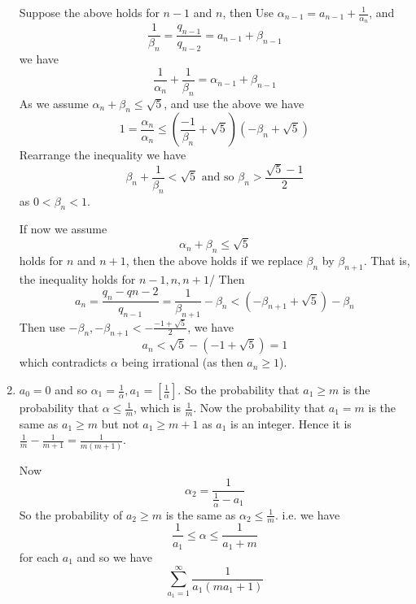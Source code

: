 \begin{enumerate}
      Suppose the above holds for $n-1$ and $n$, then
      Use $\alpha_{n-1}=a_{n-1}+\frac{1}{\alpha_n}$, and
      $$\frac{1}{\beta_n}=\frac{q_{n-1}}{q_{n-2}}=a_{n-1}+\beta_{n-1}$$
      we have
      $$\frac{1}{\alpha_n}+\frac{1}{\beta_n}=\alpha_{n-1}+\beta_{n-1}$$
      As we assume $\alpha_n+\beta_n \le \sqrt{5}$, and use the above we have
      $$1=\frac{\alpha_n}{\alpha_n} \le \left(\frac{-1}{\beta_n} +\sqrt{5}\right)
      \left(-\beta_n+\sqrt{5}\right)$$
      Rearrange the inequality we have
      $$\beta_n+\frac{1}{\beta_n} < \sqrt{5} \text{ and so } \beta_n >\frac{\sqrt{5}-1}{2}$$
      as $0<\beta_n<1$.

      If now we assume $$\alpha_n+\beta_n \le \sqrt{5}$$ holds for $n$ and $n+1$, then the above
      holds if we replace $\beta_n$ by $\beta_{n+1}$. That is, the inequality holds for $n-1,n,n+1$/
      Then
      $$a_n=\frac{q_n-q{n-2}}{q_{n-1}}=\frac{1}{\beta_{n+1}}-\beta_n
      <(-\beta_{n+1}+\sqrt{5})-\beta_n$$
      Then use $-\beta_n,-\beta_{n+1}<-\frac{-1+\sqrt{5}}{2}$, we have
      $$a_n<\sqrt{5}-(-1+\sqrt{5})=1$$
      which contradicts $\alpha$ being irrational (as then $a_n \ge 1$).
\item $a_0=0$ and so $\alpha_1=\frac{1}{\alpha},a_1=[\frac{1}{\alpha}]$. So the probability that
      $a_1 \ge m$ is the probability that $\alpha \le \frac{1}{m}$, which is $\frac{1}{m}$. Now the
      probability that $a_1=m$ is the same as $a_1 \ge m$ but not $a_1 \ge m+1$ as $a_1$ is an integer.
      Hence it is $\frac{1}{m}-\frac{1}{m+1}=\frac{1}{m(m+1)}$.

      Now
      $$\alpha_2=\frac{1}{\frac{1}{\alpha}-a_1}$$
      So the probability of $a_2 \ge m$ is the same as $\alpha_2 \le \frac{1}{m}$. i.e. we have
      $$\frac{1}{a_1} \le \alpha \le \frac{1}{a_1+m}$$ for each $a_1$
      and so we have
      $$\sum_{a_1=1}^{\infty}\frac{1}{a_1(ma_1+1)}$$


\end{enumerate}
